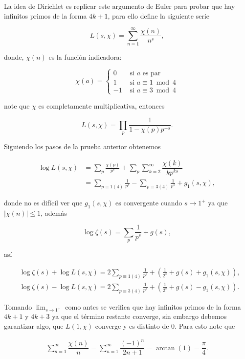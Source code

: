 La idea de Dirichlet es replicar este argumento de Euler para probar que hay infinitos primos de la forma $4k+1$, para ello define la siguiente serie

$$
L(s, \chi)=\sum_{n=1}^{\infty} \frac{\chi(n)}{n^s},
$$

donde, $\chi(n)$ es la función indicadora:

$$
\chi(a)= \begin{cases}0 & \text { si } a \text { es par } \\ 1 & \text { si } a \equiv 1 \bmod 4 \\ -1 & \text { si } a \equiv 3 \bmod 4\end{cases}
$$

note que $\chi$ es completamente multiplicativa, entonces

$$
L(s, \chi)=\prod_p \frac{1}{1-\chi(p) p^{-s}}.
$$

Siguiendo los pasos de la prueba anterior obtenemos

\begin{align*}
    \log L(s, \chi)&=\sum_p \frac{\chi(p)}{p^s}+\sum_p\sum_{k=2}^{\infty}\dfrac{\chi(k)}{kp^{ks}}\\
    &=\sum_{p\equiv 1(4)}\frac{1}{p^s}- \sum_{p\equiv 3(4)}\frac{1}{p^s}+g_1(s,\chi)
,\end{align*}

donde no es difícil ver que $g_1(s,\chi)$ es convergente cuando $s\to 1^{+}$ ya que $|\chi(n)|\leq 1$, además

$$\log \zeta(s)=\sum_p \frac{1}{p^s}+g(s),$$

así

$$\begin{aligned}
& \log \zeta(s)+\log L(s, \chi)=2 \sum_{p \equiv 1(4)} \frac{1}{p^s}+\left(\frac{1}{2^s}+g(s)+g_1(s, \chi)\right), \\
& \log \zeta(s)-\log L(s, \chi)=2 \sum_{p \equiv 3(4)} \frac{1}{p^s}+\left(\frac{1}{2^s}+g(s)-g_1(s, \chi)\right).
\end{aligned}$$

Tomando $\lim_{s\to 1^{+}}$ como antes se verifica que hay infinitos primos de la forma $4k+1$ y $4k+3$ ya que el término restante converge, sin embargo debemos garantizar algo, que $L(1,\chi)$ converge y es distinto de 0. Para esto note  que

\begin{align*}
    \sum_{n=1}^{\infty}\dfrac{\chi(n)}{n}=\sum_{n=1}^{\infty}\dfrac{(-1)^n}{2n+1}=\arctan(1)=\dfrac{\pi}{4}
.\end{align*}

